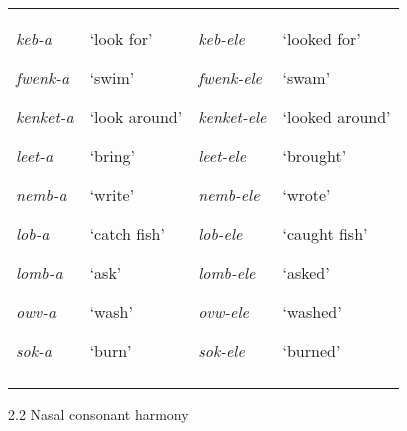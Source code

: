 \documentclass[output=paper]{langsci/langscibook}
\begin{document}
\begin{tabular}{llll}
\lsptoprule
{\mdseries \emph{keb-a}}

{\mdseries \emph{fwenk-a}}

{\mdseries \emph{kenket-a}}

{\mdseries \emph{leet-a}}

{\mdseries \emph{nemb-a}}

{\mdseries \emph{lob-a}}

{\mdseries \emph{lomb-a}}

{\mdseries \emph{owv-a}}

\mdseries \emph{sok-a} & {\mdseries ‘look for’}

{\mdseries ‘swim’}

{\mdseries ‘look around’}

{\mdseries ‘bring’}

{\mdseries ‘write’}

{\mdseries ‘catch fish’}

{\mdseries ‘ask’}

{\mdseries ‘wash’}

\mdseries ‘burn’ & {\mdseries \emph{keb-ele}}

{\mdseries \emph{fwenk-ele}}

{\mdseries \emph{kenket-ele}}

{\mdseries \emph{leet-ele}}

{\mdseries \emph{nemb-ele}}

{\mdseries \emph{lob-ele}}

{\mdseries \emph{lomb-ele}}

{\mdseries \emph{ovw-ele}}

\mdseries \emph{sok-ele} & {\mdseries ‘looked for’}

{\mdseries ‘swam’}

{\mdseries ‘looked around’}

{\mdseries ‘brought’}

{\mdseries ‘wrote’}

{\mdseries ‘caught fish’}

{\mdseries ‘asked’}

{\mdseries ‘washed’}

\mdseries ‘burned’\\
\lspbottomrule
\end{tabular}
\begin{stylelsSectionii}
2.2 Nasal consonant harmony 
\end{stylelsSectionii}
\end{document}
